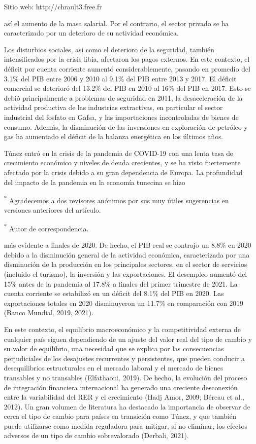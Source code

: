 \documentclass[11pt,a4paper]{article}
\begin{document}
Sitio web: http://chrault3.free.fr

así el aumento de la masa salarial. Por el contrario, el sector privado se ha caracterizado por un deterioro de su actividad económica.

Los disturbios sociales, así como el deterioro de la seguridad, también intensificados por la crisis libia, afectaron los pagos externos. En este contexto, el déficit por cuenta corriente aumentó considerablemente, pasando en promedio del 3.1\% del PIB entre 2006 y 2010 al 9.1\% del PIB entre 2013 y 2017. El déficit comercial se deterioró del 13.2\% del PIB en 2010 al 16\% del PIB en 2017. Esto se debió principalmente a problemas de seguridad en 2011, la desaceleración de la actividad productiva de las industrias extractivas, en particular el sector industrial del fosfato en Gafsa, y las importaciones incontroladas de bienes de consumo. Además, la disminución de las inversiones en exploración de petróleo y gas ha aumentado el déficit de la balanza energética en los últimos años.

Túnez entró en la crisis de la pandemia de COVID-19 con una lenta tasa de crecimiento económico y niveles de deuda crecientes, y se ha visto fuertemente afectado por la crisis debido a su gran dependencia de Europa. La profundidad del impacto de la pandemia en la economía tunecina se hizo

\textsuperscript{*} Agradecemos a dos revisores anónimos por sus muy útiles sugerencias en versiones anteriores del artículo.

\textsuperscript{*} Autor de correspondencia.

más evidente a finales de 2020. De hecho, el PIB real se contrajo un 8.8\% en 2020 debido a la disminución general de la actividad económica, caracterizada por una disminución de la producción en los principales sectores, en el sector de servicios (incluido el turismo), la inversión y las exportaciones. El desempleo aumentó del 15\% antes de la pandemia al 17.8\% a finales del primer trimestre de 2021. La cuenta corriente se estabilizó en un déficit del 8.1\% del PIB en 2020. Las exportaciones totales en 2020 disminuyeron un 11.7\% en comparación con 2019 (Banco Mundial, 2019, 2021).

En este contexto, el equilibrio macroeconómico y la competitividad externa de cualquier país siguen dependiendo de un ajuste del valor real del tipo de cambio y su valor de equilibrio, una necesidad que se explica por las consecuencias perjudiciales de los desajustes recurrentes y persistentes, que pueden conducir a desequilibrios estructurales en el mercado laboral y el mercado de bienes transables y no transables (Elfathaoui, 2019). De hecho, la evolución del proceso de integración financiera internacional ha generado una creciente desconexión entre la variabilidad del RER y el crecimiento (Hadj Amor, 2009; Béreau et al., 2012). Un gran volumen de literatura ha destacado la importancia de observar de cerca el tipo de cambio para países en transición como Túnez, y que también puede utilizarse como medida reguladora para mitigar, si no eliminar, los efectos adversos de un tipo de cambio sobrevalorado (Derbali, 2021).
\end{document}
